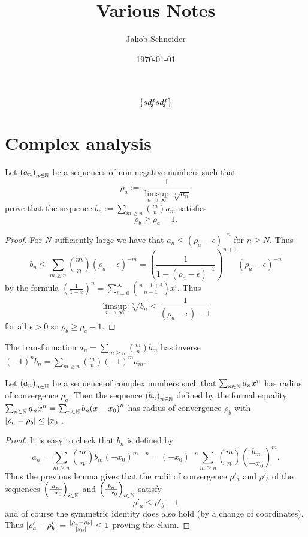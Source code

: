 \documentclass[8pt,a4paper]{article}
\begin{document}
\title{Various Notes}
\author{Jakob Schneider}
\date{\today}
\maketitle
\label{a}

\makeatletter
\def\com#1{\@ifnextchar[{\a#1}{\b#1}}
\def\a#1[#2]{Hallo}
\def\b#1{Tschüss #1}
%
$$
\set{sdfsdf}
$$
\section{Complex analysis}

\begin{lemma}
Let $\seq{a_n}_{n\in\nats}$ be a sequences of non-negative numbers such that
$$
\rho_a:=\frac 1{\limsup_{n\to\infty}{\sqrt[n]{a_n}}}
$$
prove that the sequence $b_n:=\sum_{m\geq n}{\binom m n a_m}$ satisfies
$$
\rho_b\geq \rho_a-1.
$$
\end{lemma}

\begin{proof}
    For $N$ sufficiently large we have that $a_n\leq{(\rho_a-\epsilon)}^{-n}$ for $n\geq N$.
    Thus
    $$
    b_n\leq \sum_{m\geq n}{\binom m n {(\rho_a-\epsilon)}^{-m}}={\left(\frac 1 {1-{(\rho_a-\epsilon)}^{-1}}\right)}^{n+1}{(\rho_a-\epsilon)}^{-n}
    $$
    by the formula ${\left(\frac 1 {1-x}\right)}^n=\sum_{i=0}^\infty{\binom{n-1+i}{n-1}x^i}$.
    Thus
    $$
    \limsup_{n\to\infty}\sqrt[n]{b_n}\leq \frac 1 {(\rho_a-\epsilon)-1}
    $$
    for all $\epsilon>0$ so $\rho_b\geq \rho_a-1$.    
\end{proof}

\begin{remark}
    The transformation $a_n=\sum_{m\geq n}{\binom{m}{n}b_m}$ has inverse ${(-1)}^n b_n=\sum_{m\geq n}{\binom{m}{n}{(-1)}^m a_m}$.
\end{remark}

\begin{lemma}
    Let $\seq{a_n}_{n\in\nats}$ be a sequence of complex numbers such that $\sum_{n\in\mathbb{N}}{a_n x^n}$ has radius of convergence $\rho_a$. Then the sequence $\seq{b_n}_{n\in\nats}$ defined by the formal equality $\sum_{n\in\mathbb{N}}{a_n x^n}=\sum_{n\in\mathbb{N}}{b_n {(x-x_0)}^n}$ has radius of convergence $\rho_b$ with $\left|\rho_a-\rho_b\right|\leq\left|x_0\right|$.
\end{lemma}

\begin{proof}
    It is easy to check that $b_n$ is defined by
    $$
    a_n=\sum_{m\geq n}{\binom{m}{n}b_m{(-x_0)}^{m-n}}={(-x_0)}^{-n}\sum_{m\geq n}{\binom{m}{n}{\left(\frac{b_m}{-x_0}\right)}^m}.
    $$
    Thus the previous lemma gives that the radii of convergence $\rho'_a$ and $\rho'_b$ of the sequences
    $\seq{\frac{a_n}{-x_0}}_{i\in \nats}$ and $\seq{\frac{b_n}{-x_0}}_{i\in \nats}$ satisfy
    $$
    \rho'_a\leq \rho'_b-1
    $$
    and of course the symmetric identity does also hold (by a change of coordinates). Thus $\left|\rho'_a-\rho'_b\right|=\frac{\left|\rho_a-\rho_b\right|}{\left|x_0\right|}\leq 1$ proving the claim.
\end{proof}
\end{document}
